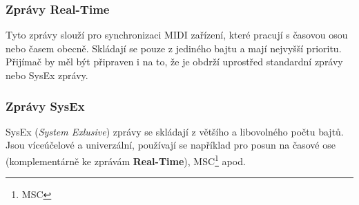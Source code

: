 \subsubsection{Zprávy Real-Time}
Tyto zprávy slouží pro synchronizaci \acs{MIDI} zařízení, které pracují s časovou osou nebo časem obecně. Skládají se pouze z jediného bajtu a mají nejvyšší prioritu. Přijímač by měl být připraven i na to, že je obdrží uprostřed standardní zprávy nebo SysEx zprávy. \cite{MIDIspecs}

\subsubsection{Zprávy SysEx}
SysEx (\emph{System Exlusive}) zprávy se skládají z většího a libovolného počtu bajtů. Jsou víceúčelové a univerzální, používají se například pro posun na časové ose (komplementárně ke zprávám \textbf{Real-Time}), \acs{MSC}\footnote{\acl{MSC}} apod. \cite{MIDIspecs}

%